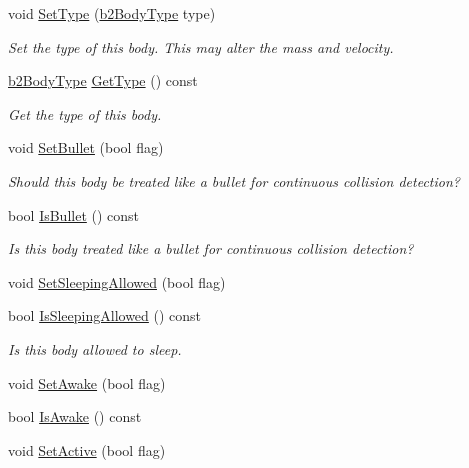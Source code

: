 \begin{DoxyCompactItemize}
void \mbox{\hyperlink{classb2_body_a34ff1c84b10b74eb990749a025a1b1ad}{Set\+Type}} (\mbox{\hyperlink{b2_body_8h_a74ddb02261648c2bff691a866b5c03e0}{b2\+Body\+Type}} type)
\begin{DoxyCompactList}\small\item\em Set the type of this body. This may alter the mass and velocity. \end{DoxyCompactList}\item 
\mbox{\hyperlink{b2_body_8h_a74ddb02261648c2bff691a866b5c03e0}{b2\+Body\+Type}} \mbox{\hyperlink{classb2_body_a9c2234b5a5fff91305a65ecd0cf0ee59}{Get\+Type}} () const
\begin{DoxyCompactList}\small\item\em Get the type of this body. \end{DoxyCompactList}\item 
void \mbox{\hyperlink{classb2_body_a3253af3725b8d6d63d8223bcd2ddab5c}{Set\+Bullet}} (bool flag)
\begin{DoxyCompactList}\small\item\em Should this body be treated like a bullet for continuous collision detection? \end{DoxyCompactList}\item 
bool \mbox{\hyperlink{classb2_body_ad99db1c7a19e8de333ff7f65b0b953f4}{Is\+Bullet}} () const
\begin{DoxyCompactList}\small\item\em Is this body treated like a bullet for continuous collision detection? \end{DoxyCompactList}\item 
void \mbox{\hyperlink{classb2_body_a229a6de228416203fecbf7a7544c33bb}{Set\+Sleeping\+Allowed}} (bool flag)
\item 
bool \mbox{\hyperlink{classb2_body_ac47251de3a8c0ccff620be7bd5ae696a}{Is\+Sleeping\+Allowed}} () const
\begin{DoxyCompactList}\small\item\em Is this body allowed to sleep. \end{DoxyCompactList}\item 
void \mbox{\hyperlink{classb2_body_ac72ed3df52a26c33db82252ab57399af}{Set\+Awake}} (bool flag)
\item 
bool \mbox{\hyperlink{classb2_body_a697f708427cdf7d31a626e80e694682c}{Is\+Awake}} () const
\item 
void \mbox{\hyperlink{classb2_body_ab8059b7b3e3b64aee17b54f68f7dde80}{Set\+Active}} (bool flag)
\item 

\end{DoxyCompactItemize}
